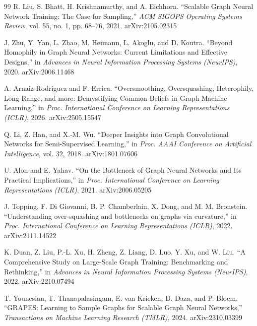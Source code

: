\begin{thebibliography}{99}
R. Liu, S. Bhatt, H. Krishnamurthy, and A. Eichhorn. ``Scalable Graph Neural Network Training: The Case for Sampling,'' \textit{ACM SIGOPS Operating Systems Review}, vol. 55, no. 1, pp. 68--76, 2021. arXiv:2105.02315

J. Zhu, Y. Yan, L. Zhao, M. Heimann, L. Akoglu, and D. Koutra. ``Beyond Homophily in Graph Neural Networks: Current Limitations and Effective Designs,'' in \textit{Advances in Neural Information Processing Systems (NeurIPS)}, 2020. arXiv:2006.11468

A. Arnaiz-Rodriguez and F. Errica. ``Oversmoothing, Oversquashing, Heterophily, Long-Range, and more: Demystifying Common Beliefs in Graph Machine Learning,'' in \textit{Proc. International Conference on Learning Representations (ICLR)}, 2026. arXiv:2505.15547

Q. Li, Z. Han, and X.-M. Wu. ``Deeper Insights into Graph Convolutional Networks for Semi-Supervised Learning,'' in \textit{Proc. AAAI Conference on Artificial Intelligence}, vol. 32, 2018. arXiv:1801.07606

U. Alon and E. Yahav. ``On the Bottleneck of Graph Neural Networks and Its Practical Implications,'' in \textit{Proc. International Conference on Learning Representations (ICLR)}, 2021. arXiv:2006.05205

J. Topping, F. Di Giovanni, B. P. Chamberlain, X. Dong, and M. M. Bronstein. ``Understanding over-squashing and bottlenecks on graphs via curvature,'' in \textit{Proc. International Conference on Learning Representations (ICLR)}, 2022. arXiv:2111.14522

K. Duan, Z. Liu, P.-L. Xu, H. Zheng, Z. Liang, D. Luo, Y. Xu, and W. Liu. ``A Comprehensive Study on Large-Scale Graph Training: Benchmarking and Rethinking,'' in \textit{Advances in Neural Information Processing Systems (NeurIPS)}, 2022. arXiv:2210.07494

T. Younesian, T. Thanapalasingam, E. van Krieken, D. Daza, and P. Bloem. ``GRAPES: Learning to Sample Graphs for Scalable Graph Neural Networks,'' \textit{Transactions on Machine Learning Research (TMLR)}, 2024. arXiv:2310.03399

\end{thebibliography}
